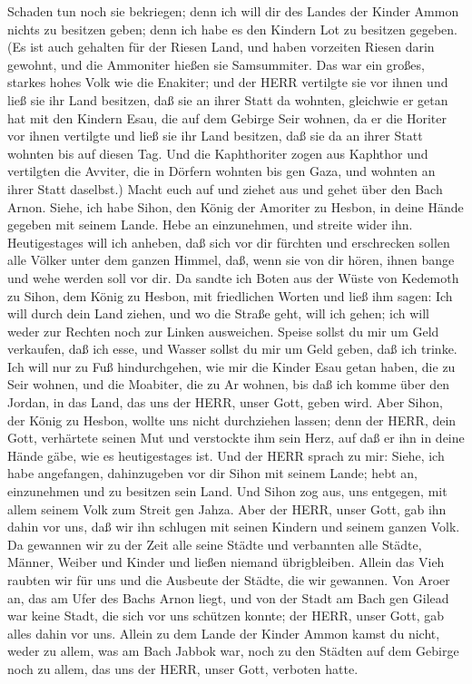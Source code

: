 Schaden tun noch sie bekriegen; denn ich will dir des Landes der Kinder
Ammon nichts zu besitzen geben; denn ich habe es den Kindern Lot zu
besitzen gegeben.  (Es ist auch gehalten für der Riesen
Land, und haben vorzeiten Riesen darin gewohnt, und die Ammoniter hießen
sie Samsummiter.  Das war ein großes, starkes hohes Volk
wie die Enakiter; und der HERR vertilgte sie vor ihnen und ließ sie ihr
Land besitzen, daß sie an ihrer Statt da wohnten, 
gleichwie er getan hat mit den Kindern Esau, die auf dem Gebirge Seir
wohnen, da er die Horiter vor ihnen vertilgte und ließ sie ihr Land
besitzen, daß sie da an ihrer Statt wohnten bis auf diesen Tag.
 Und die Kaphthoriter zogen aus Kaphthor und vertilgten die
Avviter, die in Dörfern wohnten bis gen Gaza, und wohnten an ihrer Statt
daselbst.)  Macht euch auf und ziehet aus und gehet über
den Bach Arnon. Siehe, ich habe Sihon, den König der Amoriter zu Hesbon,
in deine Hände gegeben mit seinem Lande. Hebe an einzunehmen, und
streite wider ihn.  Heutigestages will ich anheben, daß
sich vor dir fürchten und erschrecken sollen alle Völker unter dem
ganzen Himmel, daß, wenn sie von dir hören, ihnen bange und wehe werden
soll vor dir.  Da sandte ich Boten aus der Wüste von
Kedemoth zu Sihon, dem König zu Hesbon, mit friedlichen Worten und ließ
ihm sagen:  Ich will durch dein Land ziehen, und wo die
Straße geht, will ich gehen; ich will weder zur Rechten noch zur Linken
ausweichen.  Speise sollst du mir um Geld verkaufen, daß
ich esse, und Wasser sollst du mir um Geld geben, daß ich trinke. Ich
will nur zu Fuß hindurchgehen,  wie mir die Kinder Esau
getan haben, die zu Seir wohnen, und die Moabiter, die zu Ar wohnen, bis
daß ich komme über den Jordan, in das Land, das uns der HERR, unser
Gott, geben wird.  Aber Sihon, der König zu Hesbon, wollte
uns nicht durchziehen lassen; denn der HERR, dein Gott, verhärtete
seinen Mut und verstockte ihm sein Herz, auf daß er ihn in deine Hände
gäbe, wie es heutigestages ist.  Und der HERR sprach zu
mir: Siehe, ich habe angefangen, dahinzugeben vor dir Sihon mit seinem
Lande; hebt an, einzunehmen und zu besitzen sein Land.  Und
Sihon zog aus, uns entgegen, mit allem seinem Volk zum Streit gen Jahza.
 Aber der HERR, unser Gott, gab ihn dahin vor uns, daß wir
ihn schlugen mit seinen Kindern und seinem ganzen Volk.  Da
gewannen wir zu der Zeit alle seine Städte und verbannten alle Städte,
Männer, Weiber und Kinder und ließen niemand übrigbleiben. 
Allein das Vieh raubten wir für uns und die Ausbeute der Städte, die wir
gewannen.  Von Aroer an, das am Ufer des Bachs Arnon liegt,
und von der Stadt am Bach gen Gilead war keine Stadt, die sich vor uns
schützen konnte; der HERR, unser Gott, gab alles dahin vor uns.
 Allein zu dem Lande der Kinder Ammon kamst du nicht, weder
zu allem, was am Bach Jabbok war, noch zu den Städten auf dem Gebirge
noch zu allem, das uns der HERR, unser Gott, verboten hatte.

